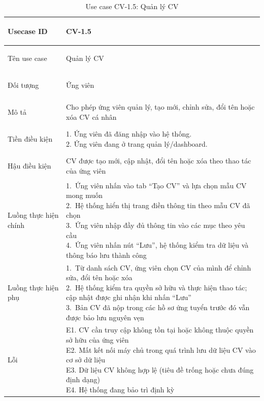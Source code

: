 \begin{table}[H]
    \centering
    \small
    \renewcommand{\arraystretch}{0.95}
    \begin{tabularx}{\textwidth}{|
        >{\bfseries\raggedright\arraybackslash}p{2.6cm}|Y|}
        \hline

        Usecase ID & CV-1.5 \\ \hline

        Tên use case & Quản lý CV \\ \hline

        Đối tượng & Ứng viên \\ \hline

        Mô tả & Cho phép ứng viên quản lý, tạo mới, chỉnh sửa, đổi tên hoặc xóa CV cá nhân \\ \hline

        Tiền điều kiện &
        \parbox[t]{\hsize}{
            1. Ứng viên đã đăng nhập vào hệ thống.\\
            2. Ứng viên đang ở trang quản lý/dashboard.
        } \\
        \hline

        Hậu điều kiện & CV được tạo mới, cập nhật, đổi tên hoặc xóa theo thao tác của ứng viên \\ \hline

        Luồng thực hiện chính &
        \parbox[t]{\hsize}{
            1.\ Ứng viên nhấn vào tab ``Tạo CV'' và lựa chọn mẫu CV mong muốn\\
            2.\ Hệ thống hiển thị trang điền thông tin theo mẫu CV đã chọn\\
            3.\ Ứng viên nhập đầy đủ thông tin vào các mục theo yêu cầu\\
            4.\ Ứng viên nhấn nút ``Lưu'', hệ thống kiểm tra dữ liệu và thông báo lưu thành công
        }\\
        \hline

        Luồng thực hiện phụ &
        \parbox[t]{\hsize}{
            1.\ Từ danh sách CV, ứng viên chọn CV của mình để chỉnh sửa, đổi tên hoặc xóa\\
            2.\ Hệ thống kiểm tra quyền sở hữu và thực hiện thao tác; cập nhật được ghi nhận khi nhấn ``Lưu''\\
            3.\ Bản CV đã nộp trong các hồ sơ ứng tuyển trước đó vẫn được bảo lưu nguyên vẹn
        }\\
        \hline

        Lỗi &
        \parbox[t]{\hsize}{
            E1. CV cần truy cập không tồn tại hoặc không thuộc quyền sở hữu của ứng viên\\
            E2. Mất kết nối máy chủ trong quá trình lưu dữ liệu CV vào cơ sở dữ liệu\\
            E3. Dữ liệu CV không hợp lệ (tiêu đề trống hoặc chưa đúng định dạng)\\
            E4. Hệ thống đang bảo trì định kỳ
        }\\
        \hline

    \end{tabularx}
    \caption{Use case CV-1.5: Quản lý CV}
    \label{tab:usecase-cv15}
\end{table}

